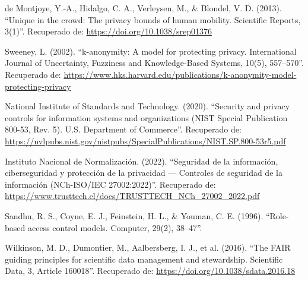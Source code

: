 \begin{enumerate}[label={[\arabic*]}]
  \item de Montjoye, Y.-A., Hidalgo, C. A., Verleysen, M., \& Blondel, V. D. (2013). “Unique in the crowd: The privacy bounds of human mobility. Scientific Reports, 3(1)”. Recuperado de: \url{https://doi.org/10.1038/srep01376}
  \item Sweeney, L. (2002). “k-anonymity: A model for protecting privacy. International Journal of Uncertainty, Fuzziness and Knowledge-Based Systems, 10(5), 557–570”. Recuperado de: \url{https://www.hks.harvard.edu/publications/k-anonymity-model-protecting-privacy}
  \item National Institute of Standards and Technology. (2020). “Security and privacy controls for information systems and organizations (NIST Special Publication 800-53, Rev. 5). U.S. Department of Commerce”. Recuperado de: \url{https://nvlpubs.nist.gov/nistpubs/SpecialPublications/NIST.SP.800-53r5.pdf}
  \item Instituto Nacional de Normalización. (2022). “Seguridad de la información, ciberseguridad y protección de la privacidad — Controles de seguridad de la información (NCh-ISO/IEC 27002:2022)”. Recuperado de: \url{https://www.trusttech.cl/docs/TRUSTTECH_NCh_27002_2022.pdf}
  \item Sandhu, R. S., Coyne, E. J., Feinstein, H. L., \& Youman, C. E. (1996). “Role-based access control models. Computer, 29(2), 38–47”.
  \item Wilkinson, M. D., Dumontier, M., Aalbersberg, I. J., et al. (2016). “The FAIR guiding principles for scientific data management and stewardship. Scientific Data, 3, Article 160018”. Recuperado de: \url{https://doi.org/10.1038/sdata.2016.18}
\end{enumerate}
